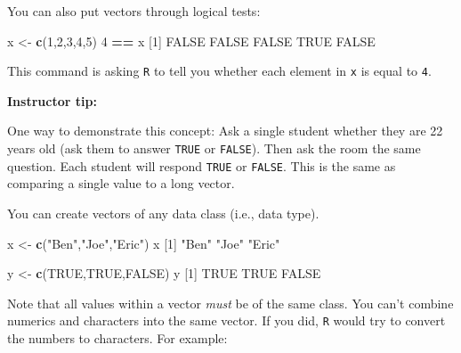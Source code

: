 \documentclass[]{book}
\newenvironment{Shaded}{\begin{snugshade}}{\end{snugshade}}
\newcommand{\DecValTok}[1]{\textcolor[rgb]{0.00,0.00,0.81}{#1}}
\newcommand{\KeywordTok}[1]{\textcolor[rgb]{0.13,0.29,0.53}{\textbf{#1}}}
\newcommand{\NormalTok}[1]{#1}
\newcommand{\OperatorTok}[1]{\textcolor[rgb]{0.81,0.36,0.00}{\textbf{#1}}}
\newcommand{\OtherTok}[1]{\textcolor[rgb]{0.56,0.35,0.01}{#1}}
\newcommand{\StringTok}[1]{\textcolor[rgb]{0.31,0.60,0.02}{#1}}
\begin{document}
You can also put vectors through logical tests:

\begin{Shaded}
\begin{Highlighting}[]
\NormalTok{x <-}\StringTok{ }\KeywordTok{c}\NormalTok{(}\DecValTok{1}\NormalTok{,}\DecValTok{2}\NormalTok{,}\DecValTok{3}\NormalTok{,}\DecValTok{4}\NormalTok{,}\DecValTok{5}\NormalTok{)}
\DecValTok{4} \OperatorTok{==}\StringTok{ }\NormalTok{x}
\NormalTok{[}\DecValTok{1}\NormalTok{] }\OtherTok{FALSE} \OtherTok{FALSE} \OtherTok{FALSE}  \OtherTok{TRUE} \OtherTok{FALSE}
\end{Highlighting}
\end{Shaded}

This command is asking \texttt{R} to tell you whether each element in \texttt{x} is equal to \texttt{4}.

\leavevmode\hypertarget{tip-text}{}%
\textbf{Instructor tip:}

One way to demonstrate this concept: Ask a single student whether they are 22 years old (ask them to answer \texttt{TRUE} or \texttt{FALSE}). Then ask the room the same question. Each student will respond \texttt{TRUE} or \texttt{FALSE}. This is the same as comparing a single value to a long vector.

You can create vectors of any data class (i.e., data type).

\begin{Shaded}
\begin{Highlighting}[]
\NormalTok{x <-}\StringTok{ }\KeywordTok{c}\NormalTok{(}\StringTok{"Ben"}\NormalTok{,}\StringTok{"Joe"}\NormalTok{,}\StringTok{"Eric"}\NormalTok{) }
\NormalTok{x}
\NormalTok{[}\DecValTok{1}\NormalTok{] }\StringTok{"Ben"}  \StringTok{"Joe"}  \StringTok{"Eric"}
\end{Highlighting}
\end{Shaded}

\begin{Shaded}
\begin{Highlighting}[]
\NormalTok{y <-}\StringTok{ }\KeywordTok{c}\NormalTok{(}\OtherTok{TRUE}\NormalTok{,}\OtherTok{TRUE}\NormalTok{,}\OtherTok{FALSE}\NormalTok{)}
\NormalTok{y}
\NormalTok{[}\DecValTok{1}\NormalTok{]  }\OtherTok{TRUE}  \OtherTok{TRUE} \OtherTok{FALSE}
\end{Highlighting}
\end{Shaded}

Note that all values within a vector \emph{must} be of the same class. You can't combine numerics and characters into the same vector. If you did, \texttt{R} would try to convert the numbers to characters. For example:
\end{document}
